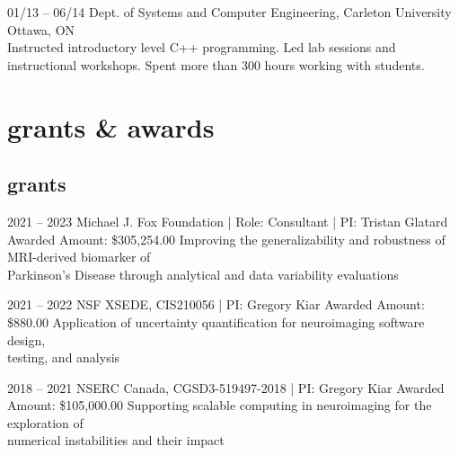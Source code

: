\documentclass[]{friggeri-cv} %
\begin{document}
\begin{entrylist}
\entry
{01/13 -- 06/14}
{Dept. of Systems and Computer Engineering, Carleton University}
{Ottawa, ON}
{\\
Instructed introductory level C++ programming. Led lab sessions and instructional workshops. Spent more than 300 hours
working with students.}
\end{entrylist}


\section{grants \& awards}
\subsection{grants}
\begin{entrylist}
\entry
{2021 -- 2023}
{Michael J. Fox Foundation | Role: Consultant | PI: Tristan Glatard}
{Awarded Amount: \$305,254.00}
{Improving the generalizability and robustness of MRI-derived biomarker of \\ Parkinson's Disease through analytical and data variability evaluations}

\entry
{2021 -- 2022}
{NSF XSEDE, CIS210056 | PI: Gregory Kiar}
{Awarded Amount: \$880.00}
{Application of uncertainty quantification for neuroimaging software design,\\ testing, and analysis}

\entry
{2018 -- 2021}
{NSERC Canada, CGSD3-519497-2018 | PI: Gregory Kiar}
{Awarded Amount: \$105,000.00}
{Supporting scalable computing in neuroimaging for the exploration of \\numerical instabilities and their impact}
\end{entrylist}
\end{document}
